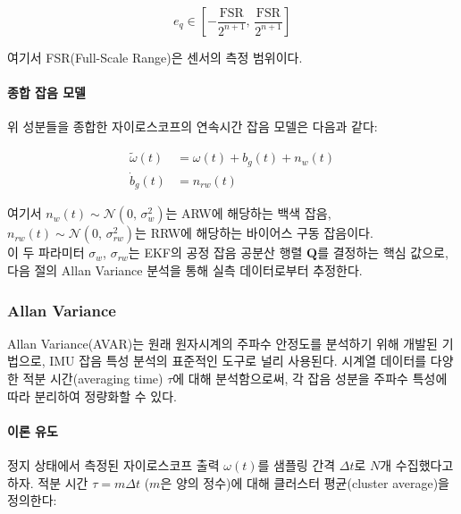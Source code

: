                 \begin{equation}
                    e_q \in \left[-\frac{\text{FSR}}{2^{n+1}},\, \frac{\text{FSR}}{2^{n+1}}\right]
                    \label{eq:quantization}
                \end{equation}

                \noindent 여기서 FSR(Full-Scale Range)은 센서의 측정 범위이다.\\

            \paragraph{종합 잡음 모델}
                위 성분들을 종합한 자이로스코프의 연속시간 잡음 모델은 다음과 같다:

                \begin{align}
                    \tilde{\omega}(t) &= \omega(t) + b_g(t) + n_w(t) \label{eq:gyro_full_model} \\
                    \dot{b}_g(t)      &= n_{rw}(t)                   \label{eq:gyro_bias_model}
                \end{align}

                \noindent 여기서 $n_w(t) \sim \mathcal{N}(0,\, \sigma_w^2)$는 ARW에 해당하는 백색 잡음, $n_{rw}(t) \sim \mathcal{N}(0,\, \sigma_{rw}^2)$는 RRW에 해당하는 바이어스 구동 잡음이다.\\

                이 두 파라미터 $\sigma_w$, $\sigma_{rw}$는 EKF의 공정 잡음 공분산 행렬 $\mathbf{Q}$를 결정하는 핵심 값으로, 다음 절의 Allan Variance 분석을 통해 실측 데이터로부터 추정한다.\\

        \subsubsection{Allan Variance}
            Allan Variance(AVAR)는 원래 원자시계의 주파수 안정도를 분석하기 위해 개발된 기법으로, IMU 잡음 특성 분석의 표준적인 도구로 널리 사용된다. 시계열 데이터를 다양한 적분 시간(averaging time) $\tau$에 대해 분석함으로써, 각 잡음 성분을 주파수 특성에 따라 분리하여 정량화할 수 있다.\\

            \paragraph{이론 유도}
                정지 상태에서 측정된 자이로스코프 출력 $\omega(t)$를 샘플링 간격 $\Delta t$로 $N$개 수집했다고 하자. 적분 시간 $\tau = m \Delta t$ ($m$은 양의 정수)에 대해 클러스터 평균(cluster average)을 정의한다:\\

